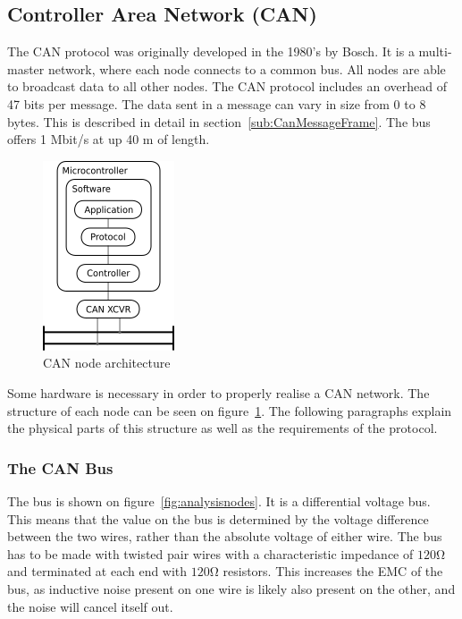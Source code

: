 
\subsection{Controller Area Network (CAN)}\label{sec:canbusanalysis}
The CAN protocol was originally developed in the 1980's by Bosch.
It is a multi-master network, where each node connects to a common bus.
All nodes are able to broadcast data to all other nodes.
The CAN protocol includes an overhead of 47 bits per message.
The data sent in a message can vary in size from 0 to 8 bytes.
This is described in detail in section~\ref{sub:CanMessageFrame}.
The bus offers 1 Mbit/s at up 40 \si{\metre} of length.

\begin{figure}[h!]
	\centering
	\includegraphics{graphics/canbus_setup}
	\caption{CAN node architecture}
	\label{fig:canbus_setup}
\end{figure}

Some hardware is necessary in order to properly realise a CAN network.
The structure of each node can be seen on figure~\ref{fig:canbus_setup}.
The following paragraphs explain the physical parts of this structure as well as the requirements of the protocol.

\subsubsection*{The CAN Bus}
The bus is shown on figure~\ref{fig:analysisnodes}.
It is a differential voltage bus.
This means that the value on the bus is determined by the voltage difference between the two wires, rather than the absolute voltage of either wire.
The bus has to be made with twisted pair wires with a characteristic impedance of $\si{120 \ohm}$ and terminated at each end with $\si{120 \ohm}$ resistors.
This increases the EMC of the bus, as inductive noise present on one wire is likely also present on the other, and the noise will cancel itself out.\\

